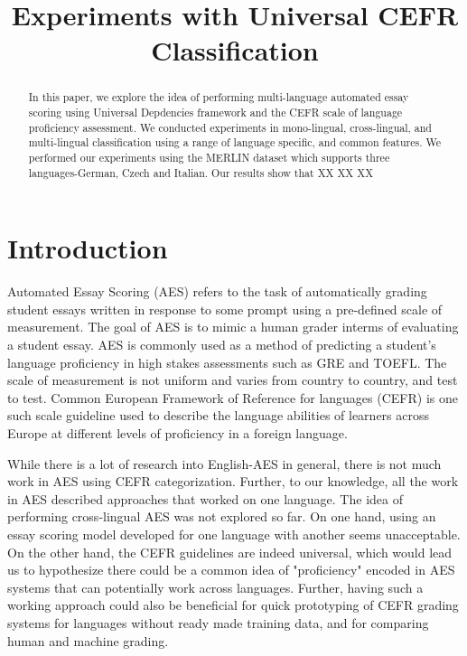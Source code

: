 \documentclass[11pt,a4paper]{article}
\title{Experiments with Universal CEFR Classification}
\date{}
\begin{document}
\maketitle
\begin{abstract}
In this paper, we explore the idea of performing multi-language automated essay scoring using Universal Depdencies framework and the CEFR scale of language proficiency assessment. We conducted experiments in mono-lingual, cross-lingual, and multi-lingual classification using a range of language specific, and common features. We performed our experiments using the MERLIN dataset which supports three languages-German, Czech and Italian. Our results show that XX XX XX
\end{abstract} %

\section{Introduction}
Automated Essay Scoring (AES) refers to the task of automatically grading student essays written in response to some prompt using a pre-defined scale of measurement. The goal of AES is to mimic a human grader interms of evaluating a student essay. AES is commonly used as a method of predicting a student's language proficiency in high stakes assessments such as GRE and TOEFL. The scale of measurement is not uniform and varies from country to country, and test to test. Common European Framework of Reference for languages (CEFR) is one such scale guideline used to describe the language abilities of learners across Europe at different levels of proficiency in a foreign language. 

While there is a lot of research into English-AES in general, there is not much work in AES using CEFR categorization. Further, to our knowledge, all the work in AES described approaches that worked on one language. The idea of performing cross-lingual AES was not explored so far. On one hand, using an essay scoring model developed for one language with another seems unacceptable. On the other hand, the CEFR guidelines are indeed universal, which would lead us to hypothesize there could be a common idea of "proficiency" encoded in AES systems that can potentially work across languages. Further, having such a working approach could also be beneficial for quick prototyping of CEFR grading systems for languages without ready made training data, and for comparing human and machine grading. 
\end{document}
